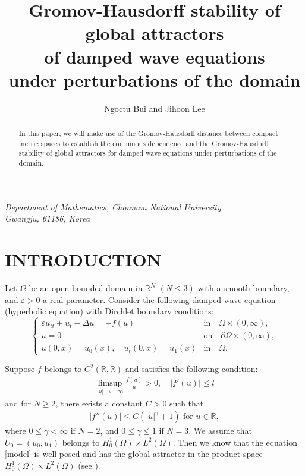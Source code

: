 \documentclass[11pt]{amsart}
\title[Gromov-Hausdorff stability of global attractors]{Gromov-Hausdorff stability of global attractors\\
of damped wave equations \\
under perturbations
of the domain}
\author{Ngoctu Bui and Jihoon Lee}
\begin{document}
\maketitle
{}
\newtheorem{theorem}{Theorem}[section]
\newtheorem{remark}{Remark}[section]
\newtheorem{definition}{Definition}[section]
\newtheorem{lemma}[theorem]{Lemma}
\newtheorem{corollary}[theorem]{Corollary}
\newtheorem{proposition}[theorem]{Proposition}
\newtheorem{example}[theorem]{Example}

\renewcommand{\footskip}{.5in}

\begin{center}
{\small \it Department of Mathematics, Chonnam National University \\
Gwangju, 61186, Korea}
\end{center}


\thispagestyle{empty}



\begin{abstract}
In this paper, we will make use of the Gromov-Hausdorff distance between compact metric spaces to establish the continuous dependence and the Gromov-Hausdorff stability of global attractors for damped wave equations under perturbations of the domain.
\end{abstract}

\section{ \textbf{INTRODUCTION}}

Let $\Omega$ be an open bounded domain in $\mathbb R^N$ $(N \le 3)$ with a smooth boundary, and $\varepsilon > 0$ a real parameter. Consider the following damped wave equation  (hyperbolic equation) with Dirchlet boundary conditions:
\begin{equation} \label{model}
\begin{cases}
\varepsilon u_{tt} + u_t - \Delta u = -f(u) ~& \mbox{in}\quad \Omega \times (0,\infty), \\
u=0 &\mbox{on} \quad \partial \Omega \times (0, \infty), \\
u(0,x) = u_0(x), \quad u_t(0,x)=u_1(x)& \mbox{in}  \quad \Omega.
\end{cases}
\end{equation}

Suppose $f$ belongs to $C^2(\mathbb{R}, \mathbb{R})$ and  satisfies the following condition: 
\begin{align*}
   \limsup_{|u|\rightarrow +\infty} {\frac{f(u)}{u}} > 0, \quad |f'(u)| \leq l
\end{align*}
and for $N\geq 2$, there exists a constant $C>0$ such that 
\begin{align*}
    |f''(u)|\leq C(|u|^\gamma +1) \mbox{ for $u \in \mathbb{R}$},
\end{align*}
where $ 0 \leq \gamma <\infty \mbox{ if } N=2$,  and $ 0\leq \gamma \leq1 \mbox{ if } N=3. $
We assume that $U_0 = (u_0, u_1)$ belongs to $H^1_0(\Omega) \times L^2(\Omega)$. Then we know that  the equation \eqref{model} is well-posed and has the global attractor in the product space $H^1_0(\Omega) \times L^2(\Omega)$ (see \cite{JK}).
\end{document}
